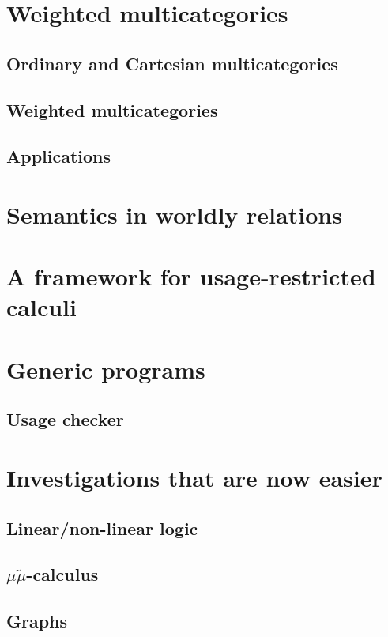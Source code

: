 \documentclass[a4paper,oneside,11pt]{book}
\theoremstyle{definition}
\begin{document}
\chapter{Weighted multicategories}
  \section{Ordinary and Cartesian multicategories}
  
  \section{Weighted multicategories}
  
  \section{Applications}

\chapter{Semantics in worldly relations}

\chapter{A framework for usage-restricted calculi}
  

\chapter{Generic programs}
  \section{Usage checker}

\chapter{Investigations that are now easier}
  \section{Linear/non-linear logic}
  
  \section{$\mu\tilde\mu$-calculus}
  \section{Graphs}
\end{document}
